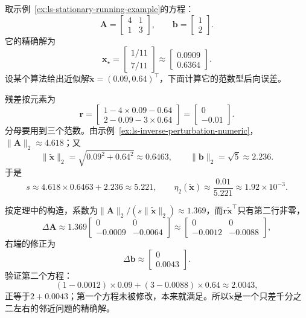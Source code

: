 \begin{example}[计算一次后向误差]
\label{ex:ls-backward-error-computation}
取示例~\ref{ex:ls-stationary-running-example}的方程：
\[
 \bm A=\begin{bmatrix}4&1\\1&3\end{bmatrix},\qquad
 \bm b=\begin{bmatrix}1\\2\end{bmatrix}.
\]
它的精确解为
\[
 \bm x_\star=\begin{bmatrix}1/11\\7/11\end{bmatrix}\approx\begin{bmatrix}0.0909\\0.6364\end{bmatrix}.
\]
设某个算法给出近似解$\tilde{\bm x}=(0.09,0.64)^\top$，下面计算它的范数型后向误差。

残差按元素为
\[
 \bm r=\begin{bmatrix}1-4\times0.09-0.64\\2-0.09-3\times0.64\end{bmatrix}=\begin{bmatrix}0\\-0.01\end{bmatrix}.
\]
分母要用到三个范数。由示例~\ref{ex:ls-inverse-perturbation-numeric}，$\lVert\bm A\rVert_2\approx4.618$；又
\[
 \lVert\tilde{\bm x}\rVert_2=\sqrt{0.09^2+0.64^2}\approx0.6463,\qquad \lVert\bm b\rVert_2=\sqrt5\approx2.236 .
\]
于是
\[
 s\approx4.618\times0.6463+2.236\approx5.221,\qquad
 \eta_2(\tilde{\bm x})\approx\frac{0.01}{5.221}\approx1.92\times10^{-3}.
\]

按定理中的构造，系数为$\lVert\bm A\rVert_2/(s\lVert\tilde{\bm x}\rVert_2)\approx1.369$，而$\bm r\tilde{\bm x}^\top$只有第二行非零，
\[
 \Delta\bm A\approx1.369\begin{bmatrix}0&0\\-0.0009&-0.0064\end{bmatrix}\approx\begin{bmatrix}0&0\\-0.0012&-0.0088\end{bmatrix},
\]
右端的修正为
\[
 \Delta\bm b\approx\begin{bmatrix}0\\0.0043\end{bmatrix}.
\]
验证第二个方程：
\[
 (1-0.0012)\times0.09+(3-0.0088)\times0.64\approx2.0043,
\]
正等于$2+0.0043$；第一个方程未被修改，本来就满足。所以$\tilde{\bm x}$是一个只差千分之二左右的邻近问题的精确解。
\end{example}

